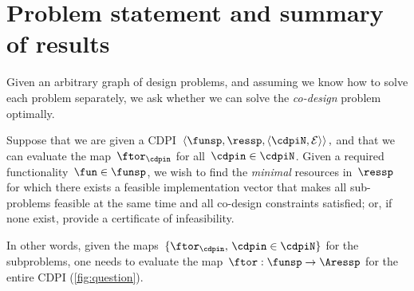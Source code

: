 


\section{Problem statement and summary of results\label{sec:Optimization}}

Given an arbitrary graph of design problems, and assuming we know
how to solve each problem separately, we ask whether we can solve
the \emph{co-design} problem optimally.
\begin{problem}
\label{prob:MCDP}Suppose that we are given a CDPI~$\left\langle \funsp,\ressp,\left\langle \cdpiN,\mathcal{E}\right\rangle \right\rangle ,$
and that we can evaluate the map~$\ftor_{\cdpin}$ for all~$\cdpin\in\cdpiN$.
Given a required functionality~$\fun\in\funsp$, we wish to find
the \emph{minimal} resources in~$\ressp$ for which there exists
a feasible implementation vector that makes all sub-problems feasible
at the same time and all co-design constraints satisfied; or, if
none exist, provide a certificate of infeasibility.
\end{problem}
In other words, given the maps~$\{\ftor_{\cdpin},\,\cdpin\in\cdpiN\}$
for the subproblems, one needs to evaluate the map~$\ftor:\funsp\rightarrow\Aressp$
for the entire CDPI (\cref{fig:question}).

